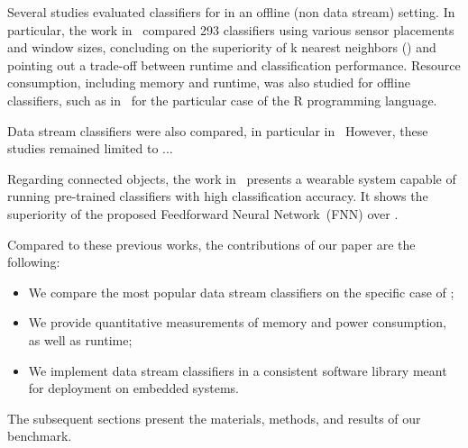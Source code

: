
Several studies evaluated classifiers for \har in an
offline (non data stream) setting. In particular, the work
in~\cite{Janidarmian_2017} compared 293 classifiers using various sensor
placements and window sizes, concluding on the superiority of k nearest
neighbors (\knn) and pointing out a trade-off between runtime and
classification performance. Resource consumption, including memory and runtime, was also studied 
for offline classifiers, such as in~\cite{memory_consumption_machine_learning}
for the particular case of the R programming language.

Data stream classifiers were also compared, in particular
in~
However, these studies remained limited to ... 

Regarding connected objects, the work in~\cite{omid_2019} presents a
wearable system capable of running pre-trained classifiers  with high classification accuracy. It shows
the superiority of the proposed Feedforward Neural
Network~(FNN) over \knn. 

Compared to these previous works, the contributions of our paper are the following:
\begin{itemize}
    \item We compare the most popular data stream classifiers on the specific case of \har;
    \item We provide quantitative measurements of memory and power consumption, as well as runtime;
    \item We implement data stream classifiers in a consistent software library meant for deployment on embedded systems.
\end{itemize} 
The subsequent sections present the materials, methods, and results of our benchmark.


